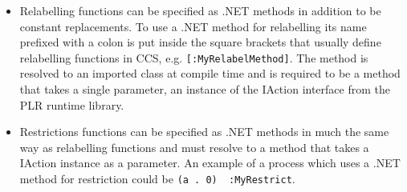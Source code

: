 \begin{itemize}
		\item Relabelling functions can be specified as .NET methods in addition 
		to be constant replacements. To use a .NET method for relabelling its name 
		prefixed with a colon is put inside the square brackets that usually 
		define relabelling functions in CCS, e.g. \texttt{[:MyRelabelMethod]}. The 
		method is resolved to an imported class at compile time and is required to 
		be a method that takes a single parameter, an instance of the 
		\textsf{IAction} interface from the PLR runtime library.
		
		\item Restrictions functions can be specified as .NET methods in much the 
		same way as relabelling functions and must resolve to a method that takes 
		a \textsf{IAction} instance as a parameter. An example of a process which 
		uses a .NET method for restriction could be \texttt{(a . 0) \ :MyRestrict}.

	\end{itemize}